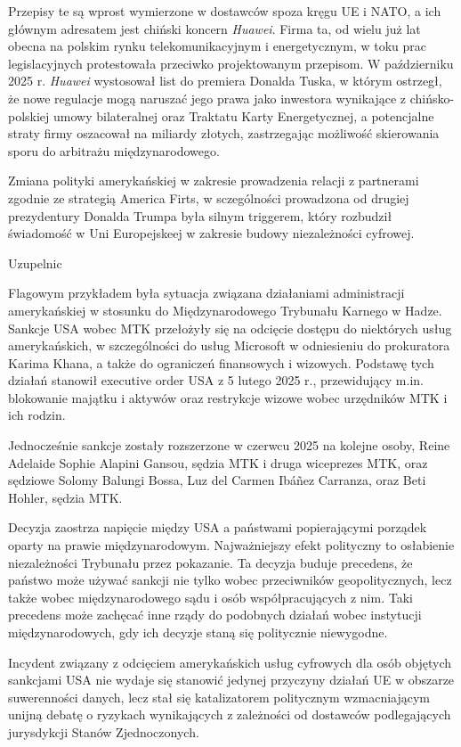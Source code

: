 \documentclass[12pt,a4paper,oneside]{book}
\begin{document}
Przepisy te są wprost wymierzone w dostawców spoza kręgu UE i NATO, a ich głównym adresatem  jest chiński koncern \textit{Huawei}. Firma ta, od wielu już lat obecna na polskim rynku telekomunikacyjnym i energetycznym, w toku prac legislacyjnych protestowała przeciwko projektowanym przepisom. W październiku 2025 r. \textit{Huawei} wystosował list do premiera Donalda Tuska, w którym ostrzegł, że nowe regulacje mogą naruszać jego prawa jako inwestora wynikające z chińsko-polskiej umowy bilateralnej oraz Traktatu Karty Energetycznej, a potencjalne straty firmy oszacował na miliardy złotych, zastrzegając możliwość skierowania sporu do arbitrażu międzynarodowego.

Zmiana polityki amerykańskiej w zakresie prowadzenia relacji z partnerami zgodnie ze strategią America Firts, w sczególności prowadzona od drugiej prezydentury Donalda Trumpa była silnym triggerem, który rozbudził świadomość w Uni Europejskeej w zakresie budowy niezależności cyfrowej.

Uzupelnic

Flagowym przykładem była sytuacja związana działaniami administracji amerykańskiej w stosunku do Międzynarodowego Trybunału Karnego w Hadze.
Sankcje USA wobec MTK przełożyły się na odcięcie dostępu do niektórych usług amerykańskich, w szczególności do usług Microsoft w odniesieniu do  prokuratora Karima Khana, a także do ograniczeń finansowych i wizowych. Podstawę tych działań stanowił executive order USA z 5 lutego 2025 r., przewidujący m.in. blokowanie majątku i aktywów oraz restrykcje wizowe wobec urzędników MTK i ich rodzin. \cite{whitehouse_icc_sanctions_2025}

Jednocześnie sankcje zostały rozszerzone  w czerwcu 2025 na kolejne osoby, Reine Adelaide Sophie Alapini Gansou, sędzia MTK i druga wiceprezes MTK, oraz sędziowe Solomy Balungi Bossa, Luz del Carmen Ibáñez Carranza, oraz Beti Hohler, sędzia MTK.

Decyzja zaostrza napięcie między USA a państwami popierającymi porządek oparty na prawie międzynarodowym. Najważniejszy efekt polityczny to osłabienie niezależności Trybunału przez pokazanie. Ta decyzja buduje precedens, że państwo może używać sankcji nie tylko wobec przeciwników geopolitycznych, lecz także wobec międzynarodowego sądu i osób współpracujących z nim. Taki precedens może zachęcać inne rządy do podobnych działań wobec instytucji międzynarodowych, gdy ich decyzje staną się politycznie niewygodne.

Incydent związany z odcięciem amerykańskich usług cyfrowych dla osób objętych sankcjami USA nie wydaje się stanowić jedynej przyczyny działań UE w obszarze suwerenności danych, lecz stał się  katalizatorem politycznym wzmacniającym unijną debatę o ryzykach wynikających z zależności od dostawców podlegających jurysdykcji Stanów Zjednoczonych.
\end{document}
